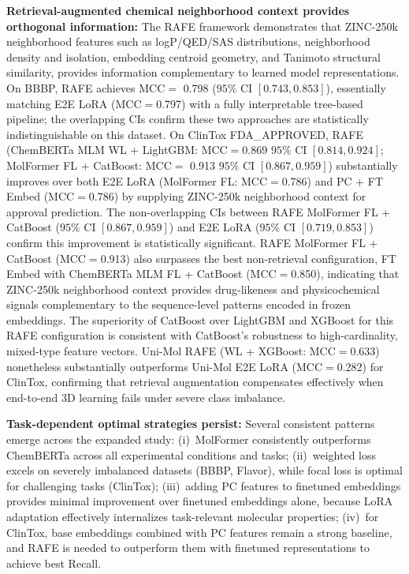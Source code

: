\documentclass[9pt,twocolumn,conference]{IEEEtran}
\begin{document}
\textbf{Retrieval-augmented chemical neighborhood context provides orthogonal information:}
The RAFE framework demonstrates that ZINC-250k neighborhood features such as logP/QED/SAS distributions, neighborhood density and isolation, embedding centroid geometry, and Tanimoto structural similarity, provides information complementary to learned model representations. On BBBP, RAFE achieves MCC$=$ 0.798 ($95\%$ CI $[0.743, 0.853]$), essentially matching E2E LoRA (MCC$=$0.797) with a fully interpretable tree-based pipeline; the overlapping CIs confirm these two approaches are statistically indistinguishable on this dataset. On ClinTox FDA\_APPROVED, RAFE (ChemBERTa MLM WL + LightGBM: MCC$=$0.869 $95\%$ CI $[0.814, 0.924]$; MolFormer FL + CatBoost: MCC$=$ 0.913 $95\%$ CI $[0.867, 0.959]$) substantially improves over both E2E LoRA (MolFormer FL: MCC$=$0.786) and PC + FT Embed (MCC$=$0.786) by supplying ZINC-250k neighborhood context for approval prediction. The non-overlapping CIs between RAFE MolFormer FL + CatBoost ($95\%$ CI $[0.867, 0.959]$) and E2E LoRA ($95\%$ CI $[0.719, 0.853]$) confirm this improvement is statistically significant. RAFE MolFormer FL + CatBoost (MCC$=$0.913) also surpasses the best non-retrieval configuration, FT Embed with ChemBERTa MLM FL + CatBoost (MCC$=$0.850), indicating that ZINC-250k neighborhood context provides drug-likeness and physicochemical signals complementary to the sequence-level patterns encoded in frozen embeddings. The superiority of CatBoost over LightGBM and XGBoost for this RAFE configuration is consistent with CatBoost's robustness to high-cardinality, mixed-type feature vectors. Uni-Mol RAFE (WL + XGBoost: MCC$=$0.633) nonetheless substantially outperforms Uni-Mol E2E LoRA (MCC$=$0.282) for ClinTox, confirming that retrieval augmentation compensates effectively when end-to-end 3D learning fails under severe class imbalance.

\textbf{Task-dependent optimal strategies persist:} Several consistent patterns emerge across the expanded study:
(i)~MolFormer consistently outperforms ChemBERTa across all experimental conditions and tasks; 
(ii)~weighted loss excels on severely imbalanced datasets (BBBP, Flavor), while focal
loss is optimal for challenging tasks (ClinTox); 
(iii)~adding PC features to finetuned embeddings provides minimal improvement over finetuned embeddings alone, because LoRA adaptation effectively internalizes task-relevant molecular properties;
(iv)~for ClinTox, base embeddings combined with PC features remain a strong baseline, and RAFE is needed to outperform them with finetuned representations to achieve best Recall.
\end{document}
